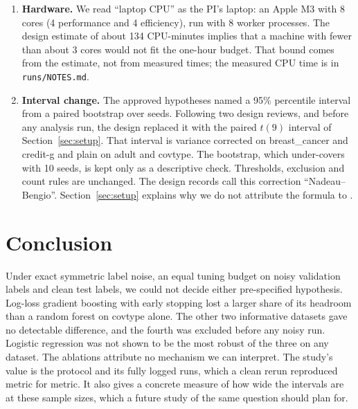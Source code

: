 \documentclass[11pt]{article}
\newcommand{\ds}[1]{\textsf{#1}}
\newcommand{\bc}{\ds{breast\_cancer}}
\newcommand{\cg}{\ds{credit-g}}
\newcommand{\ad}{\ds{adult}}
\newcommand{\ct}{\ds{covtype}}
\begin{document}
\begin{enumerate}
  (inconclusive)'', because a wide interval does not show that the methods behave alike.
  \item \textbf{Hardware.} We read ``laptop CPU'' as the PI's laptop: an Apple M3 with
  8 cores (4 performance and 4 efficiency), run with 8 worker processes. The design
  estimate of about 134 CPU-minutes implies that a machine with fewer than about 3 cores
  would not fit the one-hour budget. That bound comes from the estimate, not from measured
  times; the measured CPU time is in \texttt{runs/NOTES.md}.
  \item \textbf{Interval change.} The approved hypotheses named a 95\% percentile interval
  from a paired bootstrap over seeds. Following two design reviews, and before any analysis
  run, the design replaced it with the paired $t(9)$ interval of
  Section~\ref{sec:setup}. That interval is variance corrected on \bc{} and \cg{} and plain
  on \ad{} and \ct. The bootstrap, which under-covers with 10 seeds, is kept only as a
  descriptive check. Thresholds, exclusion and count rules are unchanged. The design records
  call this correction ``Nadeau--Bengio''. Section~\ref{sec:setup} explains why we do not
  attribute the formula to \citet{nadeau2003}.
\end{enumerate}

\section{Conclusion}
\label{sec:conclusion}

Under exact symmetric label noise, an equal tuning budget on noisy validation labels and
clean test labels, we could not decide either pre-specified hypothesis. Log-loss gradient
boosting with early stopping lost a larger share of its headroom than a random forest on
\ct{} alone. The other two informative datasets gave no detectable difference, and the
fourth was excluded before any noisy run. Logistic regression was not shown to be the most
robust of the three on any dataset. The ablations attribute no mechanism we can interpret.
The study's value is the protocol and its fully logged runs, which a clean rerun
reproduced metric for metric. It also gives a concrete
measure of how wide the intervals are at these sample sizes, which a future study of the
same question should plan for.





\end{document}
